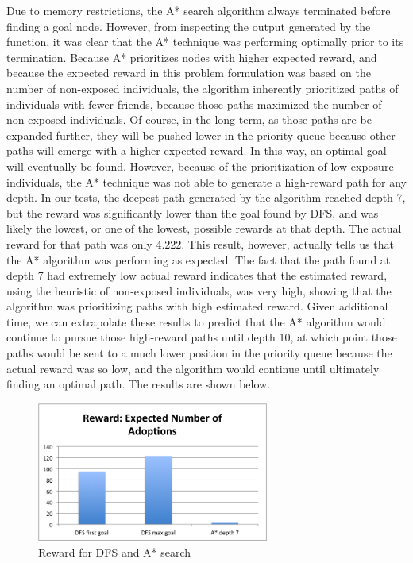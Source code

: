 \documentclass[11pt,journal]{IEEEtran}
\begin{document}
Due to memory restrictions, the A* search algorithm always terminated before finding a goal node. However, from inspecting the output generated by the function, it was clear that the A* technique was performing optimally prior to its termination. Because A* prioritizes nodes with higher expected reward, and because the expected reward in this problem formulation was based on the number of non-exposed individuals, the algorithm inherently prioritized paths of individuals with fewer friends, because those paths maximized the number of non-exposed individuals. Of course, in the long-term, as those paths are be expanded further, they will be pushed lower in the priority queue because other paths will emerge with a higher expected reward. In this way, an optimal goal will eventually be found. However, because of the prioritization of low-exposure individuals, the A* technique was not able to generate a high-reward path for any depth. In our tests, the deepest path generated by the algorithm reached depth 7, but the reward was significantly lower than the goal found by DFS, and was likely the lowest, or one of the lowest, possible rewards at that depth. The actual reward for that path was only 4.222. This result, however, actually tells us that the A* algorithm was performing as expected. The fact that the path found at depth 7 had extremely low actual reward indicates that the estimated reward, using the heuristic of non-exposed individuals, was very high, showing that the algorithm was prioritizing paths with high estimated reward. Given additional time, we can extrapolate these results to predict that the A* algorithm would continue to pursue those high-reward paths until depth 10, at which point those paths would be sent to a much lower position in the priority queue because the actual reward was so low, and the algorithm would continue until ultimately finding an optimal path. The results are shown below.

\begin{figure}[H]
\centering
    \includegraphics[width=3in]{images/part-1-results}
\caption{Reward for DFS and A* search}
\label{part-1-results}
\end{figure}
\end{document}
